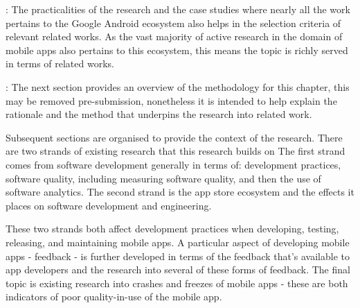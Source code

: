 : 
The practicalities of the research and the case studies where nearly all the work pertains to the Google Android ecosystem also helps in the selection criteria of relevant related works. As the vast majority of active research in the domain of mobile apps also pertains to this ecosystem, this means the topic is richly served in terms of related works.

:
The next section provides an overview of the methodology for this chapter, this may be removed pre-submission, nonetheless it is intended to help explain the rationale and the method that underpins the research into related work.

Subsequent sections are organised to provide the context of the research. There are two strands of existing research that this research builds on The first strand comes from software development generally in terms of: development practices, software quality, including measuring software quality, and then the use of software analytics. The second strand is the app store ecosystem and the effects it places on software development and engineering.

These two strands both affect development practices when developing, testing, releasing, and maintaining mobile apps. A particular aspect of developing mobile apps - feedback - is further developed in terms of the feedback that's available to app developers and the research into several of these forms of feedback. The final topic is existing research into crashes and freezes of mobile apps - these are both indicators of poor quality-in-use of the mobile app.

